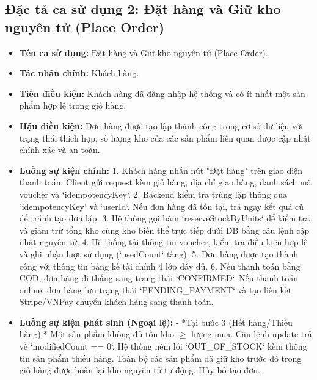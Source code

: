 \documentclass[../DoAn.tex]{subfiles}
\begin{document}
\subsection{Đặc tả ca sử dụng 2: Đặt hàng và Giữ kho nguyên tử (Place Order)}
\begin{itemize}
\item \textbf{Tên ca sử dụng:} Đặt hàng và Giữ kho nguyên tử (Place Order).
\item \textbf{Tác nhân chính:} Khách hàng.
\item \textbf{Tiền điều kiện:} Khách hàng đã đăng nhập hệ thống và có ít nhất một sản phẩm hợp lệ trong giỏ hàng.
\item \textbf{Hậu điều kiện:} Đơn hàng được tạo lập thành công trong cơ sở dữ liệu với trạng thái thích hợp, số lượng kho của các sản phẩm liên quan được cập nhật chính xác và an toàn.
\item \textbf{Luồng sự kiện chính:}
  1. Khách hàng nhấn nút "Đặt hàng" trên giao diện thanh toán. Client gửi request kèm giỏ hàng, địa chỉ giao hàng, danh sách mã voucher và `idempotencyKey`.
  2. Backend kiểm tra trùng lặp thông qua `idempotencyKey` và `userId`. Nếu đơn hàng đã tồn tại, trả ngay kết quả cũ để tránh tạo đơn lặp.
  3. Hệ thống gọi hàm `reserveStockByUnits` để kiểm tra và giảm trừ tổng kho cùng kho biến thể trực tiếp dưới DB bằng câu lệnh cập nhật nguyên tử.
  4. Hệ thống tải thông tin voucher, kiểm tra điều kiện hợp lệ và ghi nhận lượt sử dụng (`usedCount` tăng).
  5. Đơn hàng được tạo thành công với thông tin bảng kê tài chính 4 lớp đầy đủ.
  6. Nếu thanh toán bằng COD, đơn hàng đi thẳng sang trạng thái `CONFIRMED`. Nếu thanh toán online, đơn hàng lưu trạng thái `PENDING_PAYMENT` và tạo liên kết Stripe/VNPay chuyển khách hàng sang thanh toán.
\item \textbf{Luồng sự kiện phát sinh (Ngoại lệ):}
  - *Tại bước 3 (Hết hàng/Thiếu hàng):* Một sản phẩm không đủ tồn kho $\ge$ lượng mua. Câu lệnh update trả về `modifiedCount == 0`. Hệ thống ném lỗi `OUT_OF_STOCK` kèm thông tin sản phẩm thiếu hàng. Toàn bộ các sản phẩm đã giữ kho trước đó trong giỏ hàng được hoàn lại kho nguyên tử tự động. Hủy bỏ tạo đơn.
\end{itemize}
\end{document}
